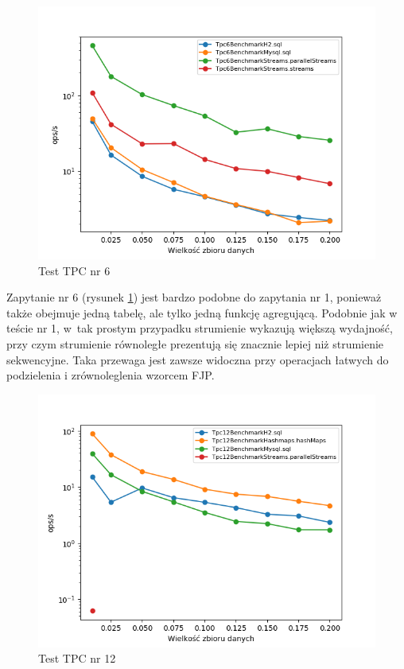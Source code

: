 \documentclass[12pt,twoside,openright]{extarticle}
\begin{document}
\newpage
\begin{figure}[H]
\centering
\includegraphics[width=15cm]{plots/Tpc6Benchmark}
\caption{Test TPC nr 6}
    \label{fig:tpc6}
\end{figure}

    Zapytanie nr 6 (rysunek \ref{fig:tpc6}) jest bardzo podobne do zapytania nr 1, ponieważ także obejmuje jedną tabelę, ale tylko jedną funkcję agregującą. Podobnie jak w teście nr 1, w~tak prostym przypadku strumienie wykazują większą wydajność, przy czym strumienie równoległe prezentują się znacznie lepiej niż strumienie sekwencyjne. Taka przewaga jest zawsze widoczna przy operacjach łatwych do podzielenia i zrównoleglenia wzorcem FJP.

\newpage
\begin{figure}[H]
\centering
\includegraphics[width=15cm]{plots/Tpc12Benchmark}
\caption{Test TPC nr 12}
    \label{fig:tpc12}
\end{figure}
\end{document}
